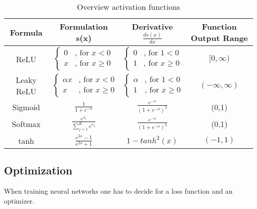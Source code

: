 \begin {table}[H]
\begin{tabular}{ c c c c }
\toprule 
Formula & Formulation s(x) & Derivative $\frac{ds(x)}{dx}$ & Function Output Range \\
\midrule 
ReLU &   $\begin{cases} 0 & \text{, for }x < 0\\
	x & \text{, for }x \geqslant 0 \end{cases}$ & $\begin{cases} 0 & \text{, for }1 < 0\\
	1 & \text{, for }x \geqslant 0 \end{cases}$ & $[ 0, \infty)$\\

\rule{0pt}{5ex}%

Leaky ReLU &   $\begin{cases} \alpha x & \text{, for }x < 0\\
	x & \text{, for }x \geqslant 0 \end{cases}$ & $\begin{cases} \alpha & \text{, for }1 < 0\\
	1 & \text{, for }x \geqslant 0 \end{cases}$ & $(- \infty, \infty)$\\

\rule{0pt}{5ex}%

Sigmoid & $\frac{1}{1+e^{-x}}$ & $\frac{e^{-x}}{(1+e^{-x})^{2}}$ & (0,1)\\

\rule{0pt}{5ex}%

Softmax & $\frac{e^{x_{i}}}{\sum_{j=1}^{K} e^{x_{j}}}$ & $\frac{e^{-x}}{(1+e^{-x})^{2}}$ & (0,1)\\

\rule{0pt}{5ex}%

tanh & $\frac{e^{2x}-1}{e^{2x}+1}$ & $1-tanh^{2}(x)$ & $(-1,1)$ \\
\bottomrule  

\end{tabular}
\caption {Overview activation functions} \label{tab:activation_functions}
\end {table}
\subsection{Optimization}
When training neural networks one has to decide for a loss function and an optimizer. 

